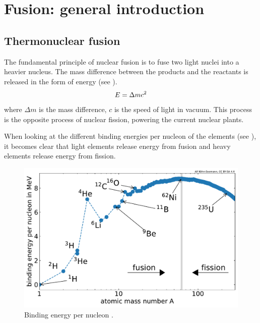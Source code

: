 \setchapterpreamble[u]{\margintoc}
\chapter{Fusion: general introduction}\label{Chapter1}


\section{Thermonuclear fusion}

The fundamental principle of nuclear fusion is to fuse two light nuclei into a heavier nucleus.
The mass difference between the products and the reactants is released in the form of energy (see ).
\begin{equation}
    E = \Delta m c^2
    \labeq{emc2}
\end{equation}
where $\Delta m$ is the mass difference, $c$ is the speed of light in vacuum.
This process is the opposite process of nuclear fission, powering the current nuclear plants.

When looking at the different binding energies per nucleon of the elements (see ), it becomes clear that light elements release energy from fusion and heavy elements release energy from fission.

\begin{figure} [h]
    \centering
    \includegraphics[width=\linewidth]{Figures/Chapter1/binding_energy_per_nucleon.pdf}
    \caption{Binding energy per nucleon \cite{kohn-seemann_alfkoehnfusion_plots_2021}.}
\end{figure}

